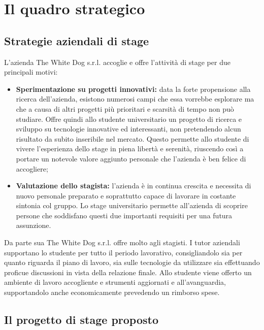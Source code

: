 \newpage
\chapter{Il quadro strategico}
\label{cap:ilquadrostrategico}

\section{Strategie aziendali di stage}

L'azienda The White Dog s.r.l. accoglie e offre l'attività di stage per due principali motivi:

\begin{itemize}
	\item \textbf{Sperimentazione su progetti innovativi:} data la forte propensione alla ricerca dell'azienda, esistono numerosi campi che essa vorrebbe esplorare ma che a causa di altri progetti più prioritari e scarsità di tempo non può studiare. Offre quindi allo studente universitario un progetto di ricerca e sviluppo su tecnologie innovative ed interessanti, non pretendendo alcun risultato da subito inseribile nel mercato. Questo permette allo studente di vivere l'esperienza dello stage in piena libertà e serenità, riuscendo così a portare un notevole valore aggiunto personale che l'azienda è ben felice di accogliere;
	\item \textbf{Valutazione dello stagista:} l'azienda è in continua crescita e necessita di nuovo personale preparato e soprattutto capace di lavorare in costante sintonia col gruppo. Lo stage universitario permette all'azienda di scoprire persone che soddisfano questi due importanti requisiti per una futura assunzione.
\end{itemize}

Da parte sua The White Dog s.r.l. offre molto agli stagisti. I tutor aziendali supportano lo studente per tutto il periodo lavorativo, consigliandolo sia per quanto riguarda il piano di lavoro, sia sulle tecnologie da utilizzare sia effettuando proficue discussioni in vista della relazione finale. Allo studente viene offerto un ambiente di lavoro accogliente e strumenti aggiornati e all'avanguardia, supportandolo anche economicamente prevedendo un rimborso spese.

\section{Il progetto di stage proposto}

